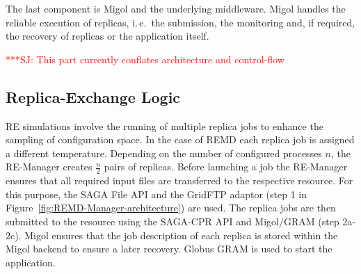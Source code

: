 \documentclass{rspublic}
\newcommand{\alnote}[1]{ {\textcolor{blue} { ***AL: #1 }}}
\newcommand{\jhanote}[1]{ {\textcolor{red} { ***SJ: #1 }}}
\newcommand{\alnote}[1]{}
\newcommand{\jhanote}[1]{}
\newcommand{\remanager}[1]{RE-Manager }
\begin{document}
The last component is Migol and the underlying middleware. 
Migol handles the reliable execution of replicas, i.\,e.\ the submission,
the monitoring and, if required, the recovery of replicas or the application itself. 



                                  

\jhanote{This part currently conflates architecture and control-flow}
                       
\subsection{Replica-Exchange Logic}
                                            
RE simulations involve the running of multiple replica jobs to enhance
the sampling of configuration space. In the case of REMD each replica
job is assigned a different temperature.  Depending on the number of
configured processes $n$, the \remanager\ creates $\frac{n}{2}$ pairs
of replicas.  Before launching a job the \remanager\ ensures that all
required input files are transferred to the respective resource. For
this purpose, the SAGA File API and the GridFTP adaptor (step 1 in
Figure~\ref{fig:REMD-Manager-architecture}) are used.  The replica
jobs are then submitted to the resource using the SAGA-CPR API and
Migol/GRAM (step 2a-2c). Migol ensures that the job description of
each replica is stored within the Migol backend to ensure a later
recovery. Globus GRAM is used to start the application.
\end{document}
